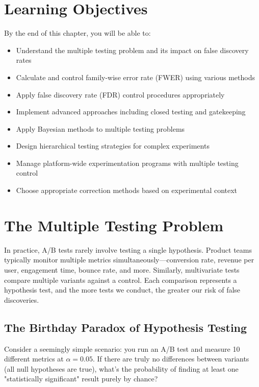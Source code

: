 
\section*{Learning Objectives}

By the end of this chapter, you will be able to:

\begin{itemize}
    \item Understand the multiple testing problem and its impact on false discovery rates
    \item Calculate and control family-wise error rate (FWER) using various methods
    \item Apply false discovery rate (FDR) control procedures appropriately
    \item Implement advanced approaches including closed testing and gatekeeping
    \item Apply Bayesian methods to multiple testing problems
    \item Design hierarchical testing strategies for complex experiments
    \item Manage platform-wide experimentation programs with multiple testing control
    \item Choose appropriate correction methods based on experimental context
\end{itemize}

\section{The Multiple Testing Problem}

In practice, A/B tests rarely involve testing a single hypothesis. Product teams typically monitor multiple metrics simultaneously—conversion rate, revenue per user, engagement time, bounce rate, and more. Similarly, multivariate tests compare multiple variants against a control. Each comparison represents a hypothesis test, and the more tests we conduct, the greater our risk of false discoveries.

\subsection{The Birthday Paradox of Hypothesis Testing}

Consider a seemingly simple scenario: you run an A/B test and measure 10 different metrics at $\alpha = 0.05$. If there are truly no differences between variants (all null hypotheses are true), what's the probability of finding at least one "statistically significant" result purely by chance?

